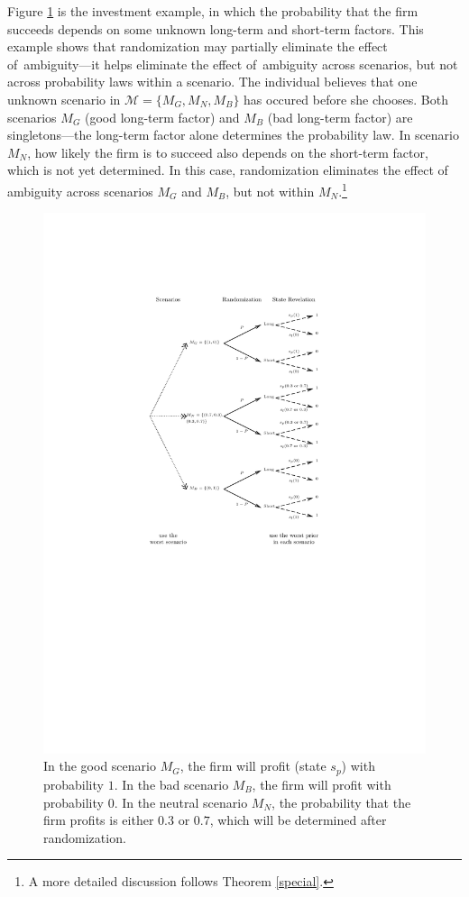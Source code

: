 \documentclass[12pt, notitlepage]{article}
\begin{document}
Figure \ref{fig_intro_eg3} is the investment example, in which the
probability that the firm succeeds depends on some unknown long-term and
short-term factors. This example shows that randomization may partially
eliminate the effect of\ ambiguity---it helps eliminate the effect of\
ambiguity across scenarios, but not across probability laws within a
scenario. The individual believes that one unknown scenario in $\mathcal{M}%
=\{M_{G},M_{N},M_{B}\}$ has occured before she chooses. Both scenarios $%
M_{G} $ (good long-term factor) and $M_{B}$ (bad long-term factor) are
singletons---the long-term factor alone determines the probability law. In
scenario $M_{N}$, how likely the firm is to succeed also depends on the
short-term factor, which is not yet determined. In this case, randomization
eliminates the effect of ambiguity across scenarios $M_{G}$ and $M_{B}$, but
not within $M_{N}$.\footnote{%
A more detailed discussion follows Theorem \ref{special}.}

\begin{figure}[h!]
  \centering   
    \includegraphics{img/intro_eg3.pdf}
    \caption{In the good
scenario $M_{G}$, the firm will profit (state $s_{p}$) with probability $1$.
In the bad scenario $M_{B}$, the firm will profit with probability $0$. In
the neutral scenario $M_{N}$, the probability that the firm profits is
either $0.3$ or $0.7$, which will be determined after randomization.}
\label{fig_intro_eg3}
\end{figure}
\end{document}

